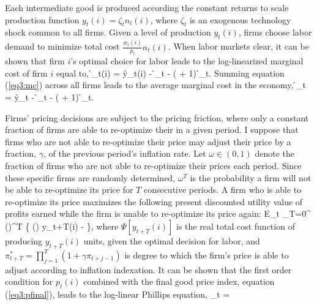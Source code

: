 Each intermediate good is produced according the constant returns to scale production function $y_t(i) = \zeta_t n_t(i)$, where $\zeta_t$ is an exogenous technology shock common to all firms.  Given a level of production $y_t(i)$, firms choose labor demand to minimize total cost $\frac{w_t(i)}{p_t}n_t(i)$.  When labor markets clear, it can be shown that firm $i$'s optimal choice for labor leads to the log-linearized marginal cost of firm $i$ equal to,
\beq \label{eq3:mc} \h{\psi}_t(i) =  \h{y}_t(i) - \h{\lambda}_t - \left( + 1\right) \h{\zeta}_t. \eeq
Summing equation (\ref{eq3:mc}) across all firms leads to the average marginal cost in the economy,
\beq \label{eq3:mc2} \h{\psi}_t =  \h{y}_t - \h{\lambda}_t - \left( + 1\right) \h{\zeta}_t. \eeq

Firms' pricing decisions are subject to the  pricing friction, where only a constant fraction of firms are able to re-optimize their in a given period.  I suppose that firms who are not able to re-optimize their price may adjust their price by a fraction, $\gamma$, of the previous period's inflation rate.  Let $\omega \in (0,1)$ denote the fraction of firms who are not able to re-optimize their prices each period.  Since these specific firms are randomly determined, $\omega^T$ is the probability a firm will not be able to re-optimize its price for $T$ consecutive periods.  A firm who is able to re-optimize its price maximizes the following present discounted utility value of profits earned while the firm is unable to re-optimize its price again:
\beq \label{eq3:intprofit}
E_t \sum_{T=0}^{\infty} \left(\omega \beta \right)^{T} 
\left\{ \left(\right) y_{t+T}(i) - \Psi\left[y_{t+T}(i)\right] \right\},
\eeq
where $\Psi\left[y_{t+T}(i)\right]$ is the real total cost function of producing $y_{t+T}(i)$ units, given the optimal decision for labor, and $\pi_{t+T}^{*} = \prod_{j=1}^{T} (1+\gamma \pi_{t+j-1})$ is degree to which the firm's price is able to adjust according to inflation indexation.  It can be shown that the first order condition for $p_{t}(i)$ combined with the final good price index, equation (\ref{eq3:pfinal}), leads to the log-linear Phillips equation,
\beq \label{eq3:phillips} \pi_t =   \eeq


